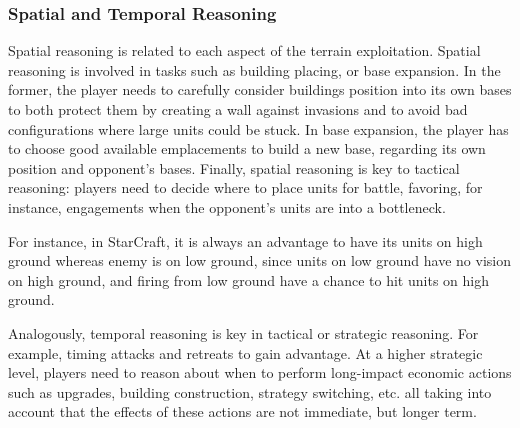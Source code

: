 \documentclass[journal]{IEEEtran}
\begin{document}
\subsubsection{Spatial and Temporal Reasoning}
Spatial  reasoning   is  related  to   each  aspect  of   the  terrain
exploitation.  Spatial reasoning is involved in tasks such as building placing, or base expansion. In the former, the player needs to
carefully  consider buildings  position  into its  own  bases to  both
protect them  by creating  a wall against  invasions and to  avoid bad
configurations  where large  units could  be stuck. In base expansion, the player has to
choose good available emplacements to  build a new base, regarding its
own  position  and opponent's  bases.  Finally,  spatial reasoning  is
key to tactical reasoning: players need to decide where to place units
for battle,  favoring, for  instance, engagements when  the opponent's
units are into a bottleneck. 

For instance, in StarCraft, it is always an advantage to  have its units  on high ground  whereas enemy is  on low ground, since units  on low ground have no vision  on high ground, and firing from low ground have a chance to  hit units on high ground.

Analogously, temporal reasoning is key in tactical or strategic reasoning. For example, timing attacks and retreats to gain advantage. At a higher strategic level, players need to reason about when to perform long-impact economic actions such as upgrades, building construction, strategy switching, etc. all taking into account that the effects of these actions are not immediate, but longer term.
\end{document}
